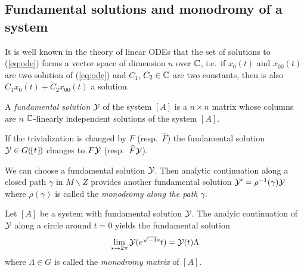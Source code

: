 \subsection{Fundamental solutions and monodromy of a system}
\begin{comment}
  See \cite[Sec.4.3.2]{Loday2014}
\end{comment}
It is well known in the theory of linear ODEs that the set of solutions to
(\ref{eq:ode}) forms a vector space of dimension $n$ over $\mathbb{C}$, i.e.\ if
$x_0(t)$ and $x_{00}(t)$ are two solution of (\ref{eq:ode}) and $C_1$,
$C_2\in\mathbb{C}$ are two constants, then is also $C_1x_0(t)+C_2x_{00}(t)$ a solution.

\begin{defn}
  A \emph{fundamental solution} $\mathcal{Y}$ of the system $[A]$ is a $n\times n$
  matrix  whose columns are $n$ $\mathbb{C}$-linearly
  independent solutions of the system $[A]$.
  \begin{comment}
    \begin{s-rem}
      This means, that $\cY$ is a solution of the \emph{matrix differential
      equation}
      \[
        dY=AY
      \]
      \comm{where the matrix $Y$ has entries in possibly multivalued functions
      }and $\det(\cY)\neq0$.
    \end{s-rem}
  \end{comment}
\end{defn}

\begin{rem}
  If the trivialization is changed by $F$ (resp.\ $\hat F$) the fundamental
  solution $\mathcal{Y}\in G(\!\{t\}\!)$ changes to $F\mathcal{Y}$ (resp.\ $\widehat F\mathcal{Y}$).
\end{rem}

\begin{comment}
  Unique \textbf{up to permutation}?\ or up to basis change?\ in the ramified
  case up to \TODO{}
\end{comment}

\begin{comment}
  for \textbf{monodromy} see \cite[130]{hotta2008}
\end{comment}
We can choose a fundamental solution $\mathcal{Y}$. Then analytic continuation along a
closed path $\gamma$ in $M\backslash Z$ provides another fundamental solution
$\mathcal{Y}'=\rho^{-1}(\gamma)\mathcal{Y}$ where $\rho(\gamma)$ is called the \emph{monodromy
along the path $\gamma$}.
\begin{defn}
  Let $[A]$ be a system with fundamental solution $\mathcal{Y}$.
  The analyic continuation of $\mathcal{Y}$ along a circle around $t=0$ yields the
  fundamental solution
  \[
    \lim_{s\to2\pi}\mathcal{Y}(e^{\sqrt{-1}s}t)=\mathcal{Y}(t)\Lambda
  \]
  where $\Lambda\in G$ is called the \emph{monodromy matrix} of $[A]$.
\end{defn}

